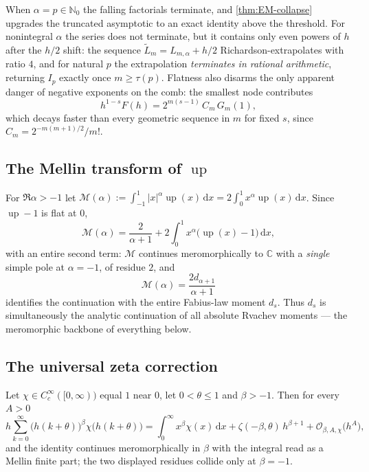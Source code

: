 \documentclass[11pt,oneside]{article}
\numberwithin{equation}{section}
\theoremstyle{definition}
\theoremstyle{remark}
\newcommand{\C}{\mathbb C}
\newcommand{\N}{\mathbb N}
\newcommand{\dd}{\,\mathrm d}
\newcommand{\Up}{\operatorname{up}}
\newcommand{\bigO}{\mathcal O}
\newcommand{\abs}[1]{\left\lvert #1\right\rvert}
\newcommand{\Mell}{\mathcal M}
\begin{document}
When $\alpha=p\in\N_0$ the falling factorials terminate, and
\cref{thm:EM-collapse} upgrades the truncated asymptotic to an exact
identity above the threshold.  For nonintegral $\alpha$ the series
does not terminate, but it contains only even powers of $h$ after the
$h/2$ shift: the sequence
$\widetilde L_m=L_{m,\alpha}+h/2$ Richardson-extrapolates with ratio
$4$, and for natural $p$ the extrapolation \emph{terminates in
rational arithmetic}, returning $I_p$ exactly once $m\ge\tau(p)$.
Flatness also disarms the only apparent danger of negative exponents
on the comb: the smallest node contributes
\begin{equation}
 h^{1-s}F(h)
 =2^{m(s-1)}\,C_m\,G_m(1),
 \label{eq:first-node}
\end{equation}
which decays faster than every geometric sequence in $m$ for fixed
$s$, since $C_m=2^{-m(m+1)/2}/m!$.

\subsection{The Mellin transform of \texorpdfstring{$\Up$}{up}}
\label{sec:mellin-up}

For $\Re\alpha>-1$ let
$\Mell(\alpha):=\int_{-1}^{1}\abs x^{\alpha}\Up(x)\dd x
=2\int_0^1x^{\alpha}\Up(x)\dd x$.  Since $\Up-1$ is flat at $0$,
\begin{equation}
 \Mell(\alpha)
 =\frac{2}{\alpha+1}
 +2\int_0^1x^{\alpha}\bigl(\Up(x)-1\bigr)\dd x,
 \label{eq:Mellin-continuation}
\end{equation}
with an entire second term: $\Mell$ continues meromorphically to $\C$
with a \emph{single} simple pole at $\alpha=-1$, of residue $2$, and
\begin{equation}
 \Mell(\alpha)=\frac{2d_{\alpha+1}}{\alpha+1}
 \label{eq:Mellin-d}
\end{equation}
identifies the continuation with the entire Fabius-law moment
$d_s$.  Thus $d_s$ is simultaneously the analytic continuation of all
absolute Rvachev moments --- the meromorphic backbone of everything
below.

\subsection{The universal zeta correction}

\begin{lemma}
\label{lem:cutoff-mellin}
Let $\chi\in C_c^\infty([0,\infty))$ equal $1$ near $0$, let
$0<\theta\le1$ and $\beta>-1$.  Then for every $A>0$
\begin{equation}
 h\sum_{k=0}^{\infty}\bigl(h(k+\theta)\bigr)^{\beta}
 \chi\bigl(h(k+\theta)\bigr)
 =\int_0^{\infty}x^{\beta}\chi(x)\dd x
 +\zeta(-\beta,\theta)\,h^{\beta+1}
 +\bigO_{\beta,A,\chi}\bigl(h^{A}\bigr),
 \label{eq:cutoff-mellin}
\end{equation}
and the identity continues meromorphically in $\beta$ with the
integral read as a Mellin finite part; the two displayed residues
collide only at $\beta=-1$.
\end{lemma}
\end{document}
